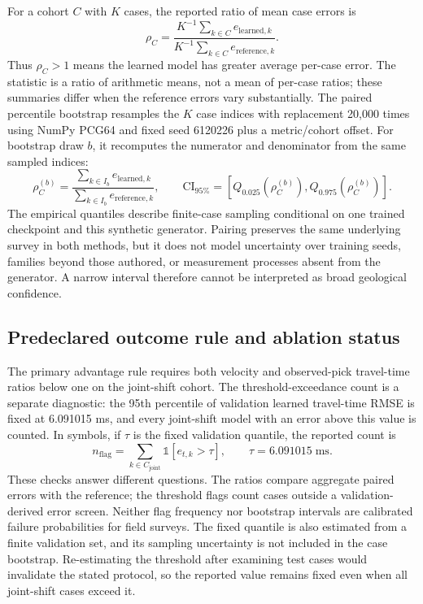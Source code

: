 \documentclass[11pt]{article}
\begin{document}
For a cohort $C$ with $K$ cases, the reported ratio of mean case errors is
\begin{equation}
\rho_C=\frac{K^{-1}\sum_{k\in C}e_{\mathrm{learned},k}}{K^{-1}\sum_{k\in C}e_{\mathrm{reference},k}}.
\label{eq:ratio}
\end{equation}
Thus $\rho_C>1$ means the learned model has greater average per-case error. The statistic is a ratio of arithmetic means, not a mean of per-case ratios; these summaries differ when the reference errors vary substantially. The paired percentile bootstrap resamples the $K$ case indices with replacement 20,000 times using NumPy PCG64 and fixed seed 6120226 plus a metric/cohort offset. For bootstrap draw $b$, it recomputes the numerator and denominator from the same sampled indices:
\begin{equation}
\rho_C^{(b)}=\frac{\sum_{k\in I_b}e_{\mathrm{learned},k}}{\sum_{k\in I_b}e_{\mathrm{reference},k}},\qquad
\mathrm{CI}_{95\%}=\left[Q_{0.025}(\rho_C^{(b)}),Q_{0.975}(\rho_C^{(b)})\right].
\label{eq:paired-bootstrap}
\end{equation}
The empirical quantiles describe finite-case sampling conditional on one trained checkpoint and this synthetic generator. Pairing preserves the same underlying survey in both methods, but it does not model uncertainty over training seeds, families beyond those authored, or measurement processes absent from the generator. A narrow interval therefore cannot be interpreted as broad geological confidence.

\subsection{Predeclared outcome rule and ablation status}
\label{sec:outcome-rule}
The primary advantage rule requires both velocity and observed-pick travel-time ratios below one on the joint-shift cohort. The threshold-exceedance count is a separate diagnostic: the 95th percentile of validation learned travel-time RMSE is fixed at 6.091015 ms, and every joint-shift model with an error above this value is counted. In symbols, if $\tau$ is the fixed validation quantile, the reported count is
\begin{equation}
n_{\mathrm{flag}}=\sum_{k\in C_{\mathrm{joint}}}\mathbb{1}[e_{t,k}>\tau],\qquad \tau=6.091015\;\mathrm{ms}.
\label{eq:flags}
\end{equation}
These checks answer different questions. The ratios compare aggregate paired errors with the reference; the threshold flags count cases outside a validation-derived error screen. Neither flag frequency nor bootstrap intervals are calibrated failure probabilities for field surveys. The fixed quantile is also estimated from a finite validation set, and its sampling uncertainty is not included in the case bootstrap. Re-estimating the threshold after examining test cases would invalidate the stated protocol, so the reported value remains fixed even when all joint-shift cases exceed it.
\end{document}
